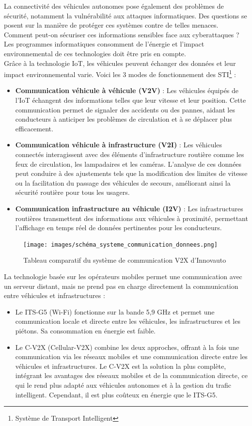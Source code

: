 La connectivité des véhicules autonomes pose également des problèmes de sécurité, notamment la vulnérabilité aux attaques informatiques. Des questions se posent sur la manière de protéger ces systèmes contre de telles menaces. Comment peut-on sécuriser ces informations sensibles face aux cyberattaques ?\\
Les programmes informatiques consomment de l’énergie et l'impact environnemental de ces technologies doit être pris en compte.\\
Grâce à la technologie IoT, les véhicules peuvent échanger des données et leur impact environnemental varie. Voici les 3 modes de fonctionnement des STI\footnote{Système de Transport Intelligent} :
\begin{itemize}
    \item \textbf{Communication véhicule à véhicule (V2V)} : Les véhicules équipés de l’IoT échangent des informations telles que leur vitesse et leur position. Cette communication permet de signaler des accidents ou des pannes, aidant les conducteurs à anticiper les problèmes de circulation et à se déplacer plus efficacement.
    \item \textbf{Communication véhicule à infrastructure (V2I)} : Les véhicules connectés interagissent avec des éléments d’infrastructure routière comme les feux de circulation, les lampadaires et les caméras. L’analyse de ces données peut conduire à des ajustements tels que la modification des limites de vitesse ou la facilitation du passage des véhicules de secours, améliorant ainsi la sécurité routière pour tous les usagers.
    \item \textbf{Communication infrastructure au véhicule (I2V)} : Les infrastructures routières transmettent des informations aux véhicules à proximité, permettant l’affichage en temps réel de données pertinentes pour les conducteurs.
\end{itemize}

\begin{figure}[H]
    \centering
    \texttt{[image: images/schéma\_systeme\_communication\_donnees.png]} 
    \caption{Tableau comparatif du système de communication V2X d'Innovauto}
\end{figure}

La technologie basée sur les opérateurs mobiles permet une communication avec un serveur distant, mais ne prend pas en charge directement la communication entre véhicules et infrastructures : 
\begin{itemize}
    \item Le ITS-G5 (Wi-Fi) fonctionne sur la bande 5,9 GHz et permet une communication locale et directe entre les véhicules, les infrastructures et les piétons. Sa consommation en énergie est faible.
    \item Le C-V2X (Cellular-V2X) combine les deux approches, offrant à la fois une communication via les réseaux mobiles et une communication directe entre les véhicules et infrastructures. Le C-V2X est la solution la plus complète, intégrant les avantages des réseaux mobiles et de la communication directe, ce qui le rend plus adapté aux véhicules autonomes et à la gestion du trafic intelligent. Cependant, il est plus coûteux en énergie que le ITS-G5.
\end{itemize}


